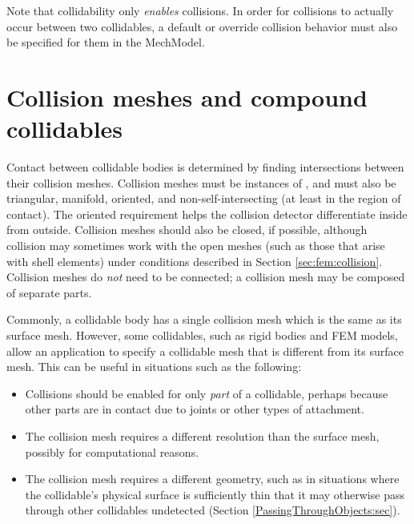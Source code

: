 Note that collidability only {\it enables} collisions.  In order for
collisions to actually occur between two collidables, a default or
override collision behavior must also be specified for them in the
MechModel.

\section{Collision meshes and compound collidables}
\label{CollisionMeshesAndCompounds:sec}

Contact between collidable bodies is determined by finding
intersections between their collision meshes.  Collision meshes must
be instances of , and must
also be triangular, manifold, oriented, and non-self-intersecting (at
least in the region of contact). The oriented requirement helps the
collision detector differentiate inside from outside.  Collision
meshes should also be closed, if possible, although collision may
sometimes work with the open meshes (such as those that arise with
shell elements) under conditions described in Section
\ref{sec:fem:collision}.  Collision meshes do {\it not} need to be
connected; a collision mesh may be composed of separate parts.

Commonly, a collidable body has a single collision mesh which is the
same as its surface mesh.  However, some collidables, such as rigid
bodies and FEM models, allow an application to specify a collidable
mesh that is different from its surface mesh.  This can be useful in
situations such as the following:

\begin{itemize}

\item Collisions should be enabled for only {\it part} of a
collidable, perhaps because other parts are in contact due to joints
or other types of attachment.

\item The collision mesh requires a different resolution
than the surface mesh, possibly for computational reasons.

\item The collision mesh requires a different geometry,
such as in situations where the collidable's physical surface is
sufficiently thin that it may otherwise pass through other collidables
undetected (Section \ref{PassingThroughObjects:sec}).

\end{itemize}

